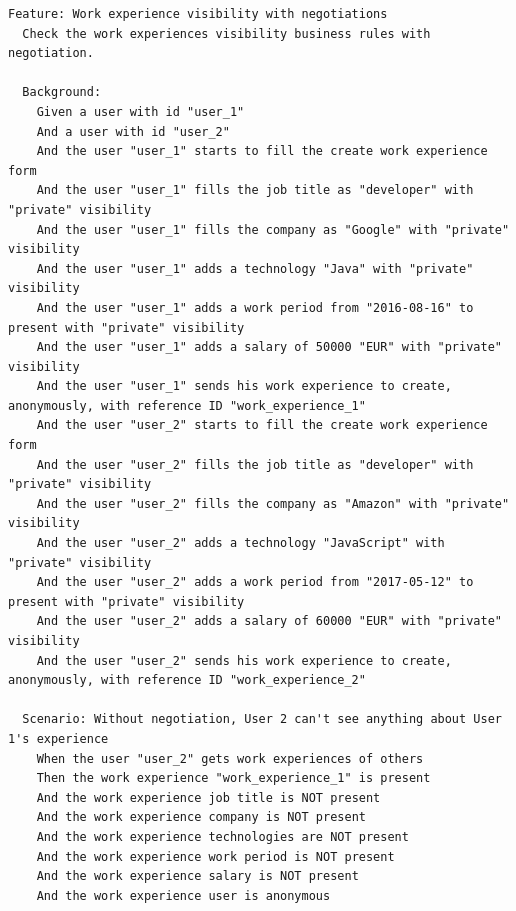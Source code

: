 \documentclass[a4paper, 12pt]{book}
\begin{document}
    {\footnotesize
        \begin{verbatim}
Feature: Work experience visibility with negotiations
  Check the work experiences visibility business rules with negotiation.

  Background:
    Given a user with id "user_1"
    And a user with id "user_2"
    And the user "user_1" starts to fill the create work experience form
    And the user "user_1" fills the job title as "developer" with "private" visibility
    And the user "user_1" fills the company as "Google" with "private" visibility
    And the user "user_1" adds a technology "Java" with "private" visibility
    And the user "user_1" adds a work period from "2016-08-16" to present with "private" visibility
    And the user "user_1" adds a salary of 50000 "EUR" with "private" visibility
    And the user "user_1" sends his work experience to create, anonymously, with reference ID "work_experience_1"
    And the user "user_2" starts to fill the create work experience form
    And the user "user_2" fills the job title as "developer" with "private" visibility
    And the user "user_2" fills the company as "Amazon" with "private" visibility
    And the user "user_2" adds a technology "JavaScript" with "private" visibility
    And the user "user_2" adds a work period from "2017-05-12" to present with "private" visibility
    And the user "user_2" adds a salary of 60000 "EUR" with "private" visibility
    And the user "user_2" sends his work experience to create, anonymously, with reference ID "work_experience_2"

  Scenario: Without negotiation, User 2 can't see anything about User 1's experience
    When the user "user_2" gets work experiences of others
    Then the work experience "work_experience_1" is present
    And the work experience job title is NOT present
    And the work experience company is NOT present
    And the work experience technologies are NOT present
    And the work experience work period is NOT present
    And the work experience salary is NOT present
    And the work experience user is anonymous


\end{verbatim}}
\end{document}
